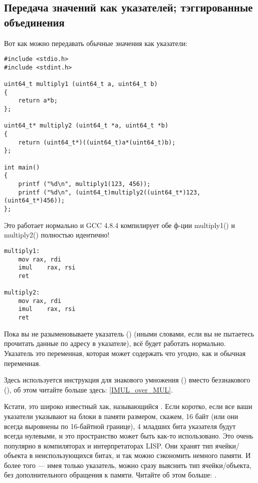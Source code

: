 \subsection{Передача значений как указателей; тэггированные объединения}

Вот как можно передавать обычные значения как указатели:

\begin{lstlisting}[label=unsigned_multiply_C,style=customc]
#include <stdio.h>
#include <stdint.h>

uint64_t multiply1 (uint64_t a, uint64_t b)
{
	return a*b;
};

uint64_t* multiply2 (uint64_t *a, uint64_t *b)
{
	return (uint64_t*)((uint64_t)a*(uint64_t)b);
};

int main()
{
	printf ("%d\n", multiply1(123, 456));
	printf ("%d\n", (uint64_t)multiply2((uint64_t*)123, (uint64_t*)456));
};
\end{lstlisting}

Это работает нормально и GCC 4.8.4 компилирует обе ф-ции multiply1() и multiply2() полностью идентично!

\begin{lstlisting}[label=unsigned_multiply_lst,style=customasmx86]
multiply1:
	mov	rax, rdi
	imul	rax, rsi
	ret

multiply2:
	mov	rax, rdi
	imul	rax, rsi
	ret
\end{lstlisting}

Пока вы не разыменовываете указатель () (иными словами, если вы не пытаетесь прочитать данные
по адресу в указателе), всё будет работать нормально.
Указатель это переменная, которая может содержать что угодно, как и обычная переменная.

Здесь используется инструкция для знакового умножения (\IMUL) вместо беззнакового (\MUL), об этом читайте больше здесь:
\ref{IMUL_over_MUL}.

Кстати, это широко известный хак, называющийся .
Если коротко, если все ваши указатели указывают на блоки в памяти размером, скажем, 16 байт (или они всегда
выровнены по 16-байтной границе), 4 младших бита указателя будут всегда нулевыми, и это пространство может быть
как-то использовано.
Это очень популярно в компиляторах и интерпретаторах LISP.
Они хранят тип ячейки/объекта в неиспользующихся битах, и так можно сэкономить немного памяти.
И более того --- имея только указатель, можно сразу выяснить тип ячейки/объекта, без дополнительного обращения к памяти.
Читайте об этом больше: .


